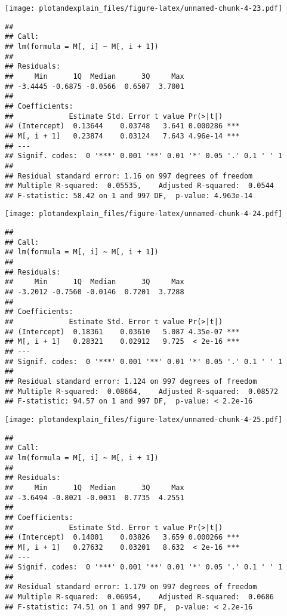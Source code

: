 \documentclass[]{article}
\begin{document}
\texttt{[image: plotandexplain\_files/figure-latex/unnamed-chunk-4-23.pdf]}

\begin{verbatim}
## 
## Call:
## lm(formula = M[, i] ~ M[, i + 1])
## 
## Residuals:
##     Min      1Q  Median      3Q     Max 
## -3.4445 -0.6875 -0.0566  0.6507  3.7001 
## 
## Coefficients:
##             Estimate Std. Error t value Pr(>|t|)    
## (Intercept)  0.13644    0.03748   3.641 0.000286 ***
## M[, i + 1]   0.23874    0.03124   7.643 4.96e-14 ***
## ---
## Signif. codes:  0 '***' 0.001 '**' 0.01 '*' 0.05 '.' 0.1 ' ' 1
## 
## Residual standard error: 1.16 on 997 degrees of freedom
## Multiple R-squared:  0.05535,    Adjusted R-squared:  0.0544 
## F-statistic: 58.42 on 1 and 997 DF,  p-value: 4.963e-14
\end{verbatim}

\texttt{[image: plotandexplain\_files/figure-latex/unnamed-chunk-4-24.pdf]}

\begin{verbatim}
## 
## Call:
## lm(formula = M[, i] ~ M[, i + 1])
## 
## Residuals:
##     Min      1Q  Median      3Q     Max 
## -3.2012 -0.7560 -0.0146  0.7201  3.7288 
## 
## Coefficients:
##             Estimate Std. Error t value Pr(>|t|)    
## (Intercept)  0.18361    0.03610   5.087 4.35e-07 ***
## M[, i + 1]   0.28321    0.02912   9.725  < 2e-16 ***
## ---
## Signif. codes:  0 '***' 0.001 '**' 0.01 '*' 0.05 '.' 0.1 ' ' 1
## 
## Residual standard error: 1.124 on 997 degrees of freedom
## Multiple R-squared:  0.08664,    Adjusted R-squared:  0.08572 
## F-statistic: 94.57 on 1 and 997 DF,  p-value: < 2.2e-16
\end{verbatim}

\texttt{[image: plotandexplain\_files/figure-latex/unnamed-chunk-4-25.pdf]}

\begin{verbatim}
## 
## Call:
## lm(formula = M[, i] ~ M[, i + 1])
## 
## Residuals:
##     Min      1Q  Median      3Q     Max 
## -3.6494 -0.8021 -0.0031  0.7735  4.2551 
## 
## Coefficients:
##             Estimate Std. Error t value Pr(>|t|)    
## (Intercept)  0.14001    0.03826   3.659 0.000266 ***
## M[, i + 1]   0.27632    0.03201   8.632  < 2e-16 ***
## ---
## Signif. codes:  0 '***' 0.001 '**' 0.01 '*' 0.05 '.' 0.1 ' ' 1
## 
## Residual standard error: 1.179 on 997 degrees of freedom
## Multiple R-squared:  0.06954,    Adjusted R-squared:  0.0686 
## F-statistic: 74.51 on 1 and 997 DF,  p-value: < 2.2e-16
\end{verbatim}
\end{document}
